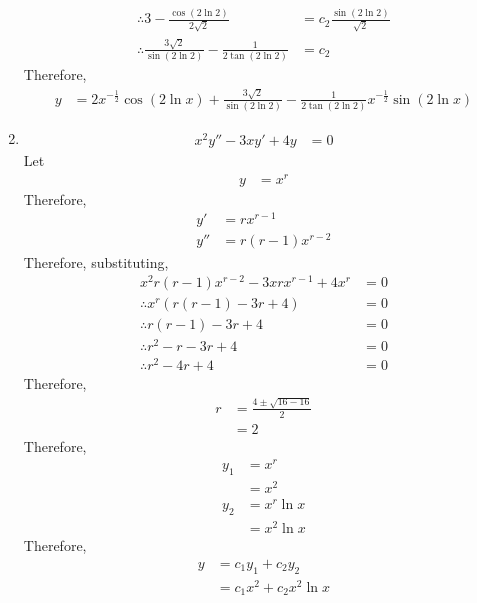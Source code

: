 \documentclass[fleqn, a4paper, 11pt, oneside]{amsart}
\theoremstyle{definition}
\theoremstyle{theorem}
\begin{document}
\begin{solution}
\begin{enumerate}[leftmargin = *]
\begin{align*}
				\therefore 3 - \frac{\cos(2 \ln 2)}{2 \sqrt{2}}                         & = c_2 \frac{\sin(2 \ln 2)}{\sqrt{2}}                                                                   \\
				\therefore \frac{3 \sqrt{2}}{\sin(2 \ln 2)} - \frac{1}{2 \tan(2 \ln 2)} & = c_2
			\end{align*}
			Therefore,
			\begin{align*}
				y & = 2 x^{-\frac{1}{2}} \cos(2 \ln x) + \frac{3 \sqrt{2}}{\sin(2 \ln 2)} - \frac{1}{2 \tan(2 \ln 2)} x^{-\frac{1}{2}} \sin(2 \ln x)
			\end{align*}
		\item
			\begin{align*}
				x^2 y'' - 3 x y' + 4 y & = 0
			\end{align*}
			Let
			\begin{align*}
				y & = x^r
			\end{align*}
			Therefore,
			\begin{align*}
				y'  & = r x^{r - 1} \\
				y'' & = r (r - 1) x^{r - 2}
			\end{align*}
			Therefore, substituting,
			\begin{align*}
				x^2 r (r - 1) x^{r - 2} - 3 x r x^{r - 1} + 4 x^r & = 0 \\
				\therefore x^r \left( r (r - 1) - 3 r + 4 \right) & = 0 \\
				\therefore r (r - 1) - 3 r + 4                    & = 0 \\
				\therefore r^2 - r - 3 r + 4                      & = 0 \\
				\therefore r^2 - 4 r + 4                          & = 0
			\end{align*}
			Therefore,
			\begin{align*}
				r & = \frac{4 \pm \sqrt{16 - 16}}{2} \\
                                  & = 2
			\end{align*}
			Therefore,
			\begin{align*}
				y_1 & = x^r       \\
                                    & = x^2       \\
				y_2 & = x^r \ln x \\
                                    & = x^2 \ln x
			\end{align*}
			Therefore,
			\begin{align*}
				y & = c_1 y_1 + c_2 y_2 \\
                                  & = c_1 x^2 + c_2 x^2 \ln x

\end{align*}
\end{enumerate}
\end{solution}
\end{document}

